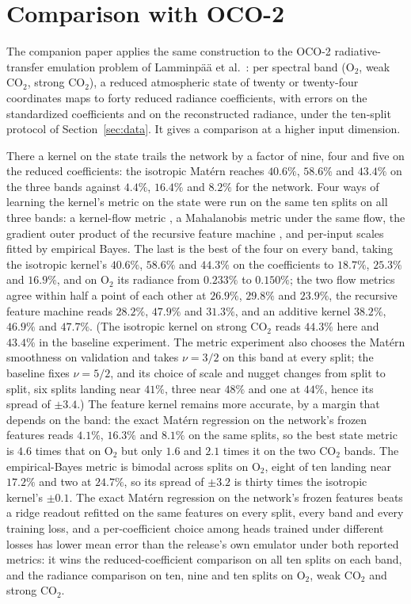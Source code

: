 \section{Comparison with OCO-2}\label{sec:oco2}

The companion paper \cite{nmkc} applies the same construction to the OCO-2 radiative-transfer
emulation problem of Lamminp\"a\"a et al.~\cite{lamminpaa}: per spectral band (O$_2$, weak
CO$_2$, strong CO$_2$), a reduced atmospheric state of twenty or twenty-four coordinates maps to
forty reduced radiance coefficients, with errors on the standardized coefficients and on the
reconstructed radiance, under the ten-split protocol of Section~\ref{sec:data}. It gives a
comparison at a higher input dimension.

There a kernel on the state trails the network by a factor of nine, four and five on the reduced
coefficients: the isotropic Mat\'ern reaches $40.6\%$, $58.6\%$ and $43.4\%$ on the three bands
against $4.4\%$, $16.4\%$ and $8.2\%$ for the network. Four ways of learning the kernel's metric
on the state were run on the same ten splits on all three bands: a kernel-flow metric
\cite{owhadiyoo}, a Mahalanobis metric under the same flow, the gradient outer product of the
recursive feature machine \cite{rfm}, and per-input scales fitted by empirical Bayes. The last is
the best of the four on every band, taking the isotropic kernel's $40.6\%$, $58.6\%$ and $44.3\%$
on the coefficients to $18.7\%$, $25.3\%$ and $16.9\%$, and on O$_2$ its radiance from $0.233\%$ to
$0.150\%$; the two flow metrics agree within half a point of each other at $26.9\%$, $29.8\%$ and
$23.9\%$, the recursive feature machine reads $28.2\%$, $47.9\%$ and $31.3\%$, and an additive
kernel $38.2\%$, $46.9\%$ and $47.7\%$. (The isotropic kernel on strong CO$_2$ reads $44.3\%$ here
and $43.4\%$ in the baseline experiment. The metric experiment also chooses the Mat\'ern smoothness
on validation and takes $\nu=3/2$ on this band at every split; the baseline fixes $\nu=5/2$, and its
choice of scale and nugget changes from split to split, six splits landing near $41\%$, three near
$48\%$ and one at $44\%$, hence its spread of $\pm3.4$.)
The feature kernel remains more accurate, by a margin that depends on the band: the exact Mat\'ern
regression on the network's frozen features reads $4.1\%$, $16.3\%$ and $8.1\%$ on the same splits,
so the best state metric is $4.6$ times that on O$_2$ but only $1.6$ and $2.1$ times it on the two
CO$_2$ bands. The empirical-Bayes metric is bimodal across splits on O$_2$, eight of ten landing near
$17.2\%$ and two at $24.7\%$, so its spread of $\pm3.2$ is thirty times the isotropic kernel's
$\pm0.1$. The exact Mat\'ern regression on the network's frozen features beats a ridge readout
refitted on the same features on every split, every band and every training loss, and a
per-coefficient choice among heads trained under different losses has lower mean error than the
release's own emulator under both reported metrics: it wins the reduced-coefficient comparison on
all ten splits on each band, and the radiance comparison on ten, nine and ten splits on O$_2$, weak
CO$_2$ and strong CO$_2$.

